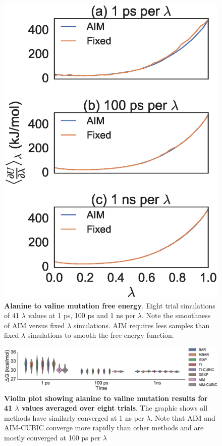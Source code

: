 \documentclass[fleqn,10pt,lineno]{wlpeerj} %
\begin{document}
\begin{figure}[htbp]
    \centering
    \includegraphics[width=1 \textwidth]{Figure_3_tripep_lambdas.eps}
    \caption{\textbf{Alanine to valine mutation free energy}. Eight trial simulations of 41 $\lambda$ values at 1 ps, 100 ps and 1 ns per $\lambda$. Note the smoothness of AIM versus fixed $\lambda$ simulations. AIM requires less samples than fixed $\lambda$ simulations to smooth the free energy function.}
    \label{a2vlineplot}
\end{figure}

\pagebreak

\begin{figure}
    \centering
    \includegraphics[width=1\textwidth]{Figure_4_A2V_41L_violinplotovertime.eps}
    \caption{\textbf{Violin plot showing alanine to valine mutation results for 41 $\lambda$ values averaged over eight trials}. The graphic shows all methods have similarly converged at 1 ns per $\lambda$. Note that AIM and AIM-CUBIC converge more rapidly than other methods and are mostly converged at 100 ps per $\lambda$}
    \label{a2vviolinplot}
\end{figure}
\end{document}

